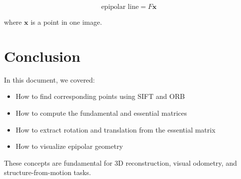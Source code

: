 \documentclass{article}
\begin{document}
\begin{equation}
    \text{epipolar line} = F \mathbf{x}
\end{equation}

where \( \mathbf{x} \) is a point in one image.

\section{Conclusion}
In this document, we covered:
\begin{itemize}
    \item How to find corresponding points using SIFT and ORB
    \item How to compute the fundamental and essential matrices
    \item How to extract rotation and translation from the essential matrix
    \item How to visualize epipolar geometry
\end{itemize}

These concepts are fundamental for 3D reconstruction, visual odometry, and structure-from-motion tasks.
\end{document}
